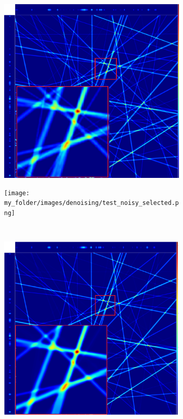 \begin{figure}[H]
	\begin{subfigure}[t]{\dimexpr.5\linewidth-1.3em\relax}
		\centering
		\includegraphics[width=.95\linewidth,valign=t]{my_folder/images/denoising/test_clean_selected.png}
	\end{subfigure}
	\hfill %
	\begin{subfigure}[t]{\dimexpr.5\linewidth-1.3em\relax}
		\centering
		\texttt{[image: my\_folder/images/denoising/test\_noisy\_selected.png]}
	\end{subfigure}
	\\[20pt]
	\begin{subfigure}[t]{\dimexpr.5\linewidth-1.3em\relax}
		\centering
		\includegraphics[width=.95\linewidth,valign=t]{my_folder/images/denoising/test_nlm.png}

\end{subfigure}
\end{figure}
